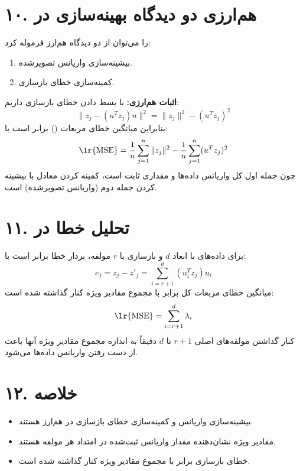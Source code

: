 \documentclass{article}
\begin{document}
\section*{۱۰. هم‌ارزی دو دیدگاه بهینه‌سازی در }
 را می‌توان از دو دیدگاه هم‌ارز فرموله کرد:
\begin{enumerate}
    \item بیشینه‌سازی واریانس تصویرشده.
    \item کمینه‌سازی خطای بازسازی.
\end{enumerate}

\textbf{اثبات هم‌ارزی:}
با بسط دادن خطای بازسازی داریم:
\[
\|z_j - (u^T z_j)u\|^2 = \|z_j\|^2 - (u^T z_j)^2
\]
بنابراین میانگین خطای مربعات () برابر است با:
\[
\text{\lr{MSE}} = \frac{1}{n} \sum_{j=1}^n \|z_j\|^2 - \frac{1}{n} \sum_{j=1}^n (u^T z_j)^2
\]
چون جمله اول کل واریانس داده‌ها و مقداری ثابت است، کمینه کردن  معادل با بیشینه کردن جمله دوم (واریانس تصویرشده) است.

\section*{۱۱. تحلیل خطا در }
برای داده‌های با ابعاد $d$ و بازسازی با $r$ مولفه، بردار خطا برابر است با:
\[
e_j = z_j - z'_j = \sum_{i=r+1}^d (u_i^T z_j) u_i
\]
میانگین خطای مربعات کل برابر با مجموع مقادیر ویژه کنار گذاشته شده است:
\[
\text{\lr{MSE}} = \sum_{i=r+1}^d \lambda_i
\]
کنار گذاشتن مولفه‌های اصلی $r+1$ تا $d$ دقیقاً به اندازه مجموع مقادیر ویژه آنها باعث از دست رفتن واریانس داده‌ها می‌شود.

\section*{۱۲. خلاصه}
\begin{itemize}
    \item بیشینه‌سازی واریانس و کمینه‌سازی خطای بازسازی در  هم‌ارز هستند.
    \item مقادیر ویژه نشان‌دهنده مقدار واریانس ثبت‌شده در امتداد هر مولفه هستند.
    \item خطای  بازسازی برابر با مجموع مقادیر ویژه کنار گذاشته شده است.
\end{itemize}
\end{document}
